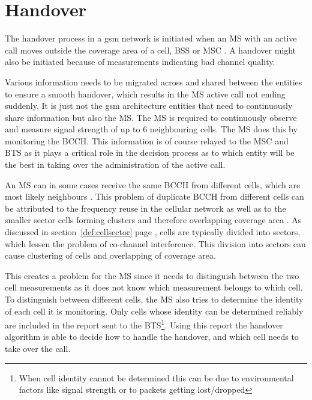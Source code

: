 \section{Handover}
\label{sec:handover}
The handover process in a \gls{gsm} network is initiated when an \gls{MS} with an active call moves outside the coverage area of a cell, \gls{BSS} or \gls{MSC} \cite{GSMArchitectureProtocolsServices,wirelesstelcoMullet,Eisenblatter}. A handover might also be initiated because of measurements indicating bad channel quality\cite{GSMArchitectureProtocolsServices}. 

Various information needs to be migrated across and shared between the entities to ensure a smooth handover, which results in the \gls{MS} active call not ending suddenly. It is just not the \gls{gsm} architecture entities that need to continuously share information but also the \gls{MS}\@. The \gls{MS} is required to continuously observe and measure signal strength of up to 6 neighbouring cells. The \gls{MS} does this by monitoring the \gls{BCCH}\cite{GSMArchitectureProtocolsServices,wirelesstelcoMullet}. This information is of course relayed to the \gls{MSC} and \gls{BTS} as it plays a critical role in the decision process as to which entity will be the best in taking over the administration of the active call\cite{GSMArchitectureProtocolsServices,wirelesstelcoMullet}.

An \gls{MS} can in some cases receive the same \gls{BCCH} from different cells, which are most likely neighbours \cite{GSMArchitectureProtocolsServices}. This problem of duplicate \gls{BCCH} from different cells can be attributed to the frequency reuse in the cellular network as well as to the smaller sector cells forming clusters and therefore overlapping coverage area \cite{GSMArchitectureProtocolsServices}. As discussed in section~\ref{def:cellsector} page \pageref{def:cellsector}, cells are typically divided into sectors, which lessen the problem of co-channel interference. This division into sectors can cause clustering of cells and overlapping of coverage area.

This creates a problem for the \gls{MS} since it needs to distinguish between the two cell measurements as it does not know which measurement belongs to which cell\cite{GSMArchitectureProtocolsServices}. To distinguish between different cells, the \gls{MS} also tries to determine the identity of each cell it is monitoring. Only cells whose identity can be determined reliably are included in the report sent to the BTS\cite{Eisenblatter,GSMArchitectureProtocolsServices,wirelesstelcoMullet}\footnote{When cell identity cannot be determined this can be due to environmental factors like signal strength or to packets getting lost/dropped}. Using this report the handover algorithm is able to decide how to handle the handover, and which cell needs to take over the call\cite{Eisenblatter,GSMArchitectureProtocolsServices,wirelesstelcoMullet}.

